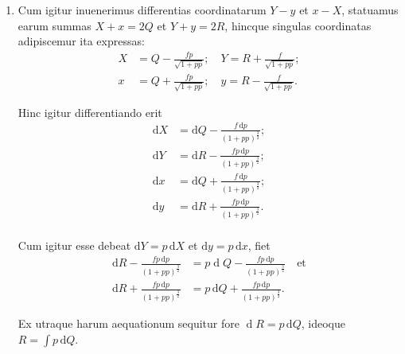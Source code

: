 \documentclass[10pt,a4paper]{article}
\def\D{\mathrm{d}}
\begin{document}
\begin{paracol}{2}
\begin{enumerate}[topsep=1px]
		\item Cum igitur inuenerimus differentias coordinatarum $Y-y$ et $x-X$, statuamus earum summas $X+x= 2Q$ et $Y+y=2R$, hincque singulas coordinatas adipiscemur ita expressas:
		\begin{align*}
			X &= Q - \frac{fp}{\sqrt{1+pp}}; \quad Y = R + \frac{f}{\sqrt{1+pp}};\\
			x &= Q+\frac{fp}{\sqrt{1+pp}}; \quad y= R- \frac{f}{\sqrt{1+pp}}.
		\end{align*}
		\par Hinc igitur differentiando erit
		\begin{align*}
			\D X &= \D Q - \frac{f\,\D p}{(1+pp)^\frac{3}{2}};\\
			\D Y &= \D R-\frac{fp\,\D p}{(1+pp)^\frac{3}{2}};\\
			\D x &= \D Q + \frac{f\,\D p}{(1+pp)^\frac{3}{2}};\\
			\D y &= \D R + \frac{fp\,\D p}{(1+pp)^\frac{3}{2}}.\\
		\end{align*}
		\par Cum igitur esse debeat $\D Y=p\,\D X$ et $\D y=p\,\D x$, fiet
		\begin{align*}
			\D R - \frac{fp\,\D p}{(1+pp)^\frac{3}{2}} &= p\operatorname{d}Q - \frac{fp\, \D p}{(1+pp)^\frac{3}{2}} \quad \text{et}\\
			\D R + \frac{fp\,\D p}{(1+pp)^\frac{3}{2}} &= p\,\D Q + \frac{fp\,\D p}{(1+pp)^\frac{3}{2}}.
	 	\end{align*}
	 	
		\par Ex utraque harum aequationum sequitur fore $\operatorname{d} R = p\,\D  Q$, ideoque $R = \int p \,\D Q$.
		

\end{enumerate}
\end{paracol}
\end{document}
